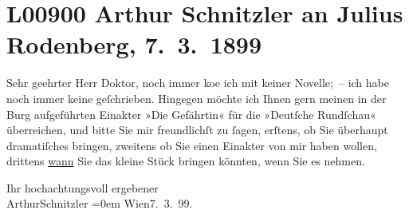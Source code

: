 

\section[Arthur Schnitzler an Julius Rodenberg, 7. 3. 1899]{L00900 Arthur Schnitzler an Julius Rodenberg, 7. 3. 1899 }
\nopagebreak{}
\rehead{ }\normalsize\beginnumbering{}
\toendnotes[C]{\smallbreak\pagebreak[2]}
\pstart{}{\pb}Sehr geehrter Herr Doktor,\pend\vspace{0.5em}
\pstart
           noch immer ko{\geminationm}e ich mit keiner Novelle; – ich habe noch
               immer keine geſchrieben. Hingegen möchte ich Ihnen gern meinen in der Burg aufgeführten Einakter »Die Gefährtin« für die »Deutſche
                  Rundſchau« überreichen, und bitte Sie mir freundlichſt zu ſagen, erſtens, ob
                  {\pb}Sie überhaupt dramatiſches bringen, zweitens ob
               Sie einen Einakter von mir haben wollen, drittens \uline{wann}{ }Sie das kleine Stück bringen könnten, wenn Sie es
               nehmen.\pend
           
\pstart
           Ihr hochachtungsvoll ergebener{\\[\baselineskip]}\spacefill\mbox{ArthurSchnitzler}\pend
           \leftskip=0em{}
\pstart
           Wien7. 3. 99.\pend
           \endnumbering{}  
      